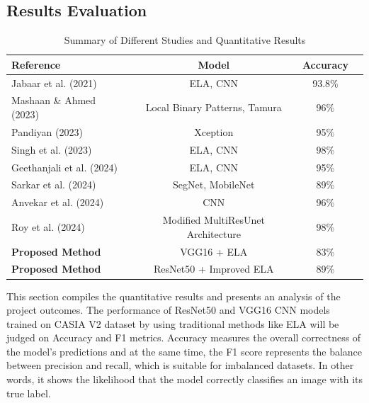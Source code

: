 \documentclass{ieeeaccess}
\begin{document}
	
\subsection{Results Evaluation}
	\begin{table}[h!]
		\centering
		\scriptsize %
		\setlength{\tabcolsep}{4pt} %
		\renewcommand{\arraystretch}{1.2} %
		\begin{tabular}{@{}lccc@{}}
			\toprule
			\textbf{Reference}            & \textbf{Model}                       & \textbf{Accuracy} \\ \midrule
			Jabaar et al.  (2021)      & ELA, CNN                             & 93.8\%                          \\
			Mashaan \& Ahmed  (2023)   & Local Binary Patterns, Tamura        & 96\%                             \\
			Pandiyan  (2023)           & Xception                             & 95\%                               \\
			Singh et al.  (2023)       & ELA, CNN                             & 98\%                              \\
			Geethanjali et al. (2024) & ELA, CNN                             & 95\%                              \\
			Sarkar et al. (2024)      & SegNet, MobileNet                    & 89\%                            \\
			Anvekar et al.  (2024)     & CNN                                  & 96\%                               \\
			Roy et al. (2024)         & Modified MultiResUnet Architecture   & 98\%                               \\ \midrule
			\textbf{Proposed Method}      & VGG16 + ELA                          & 83\%                          \\
			\textbf{Proposed Method}      & ResNet50 + Improved ELA              & 89\%                          \\ \bottomrule
		\end{tabular}
		\caption{Summary of Different Studies and Quantitative Results}
		\label{tab:summary-studies}
	\end{table}
   This section compiles the quantitative results and presents an analysis of the project outcomes. The performance of ResNet50 and VGG16 CNN models trained on CASIA V2 dataset by using traditional methods like ELA will be judged on Accuracy and F1 metrics. Accuracy measures the overall correctness of the model's predictions and at the same time, the F1 score represents the balance between precision and recall, which is suitable for imbalanced datasets. In other words, it shows the likelihood that the model correctly classifies an image with its true label.
\end{document}
